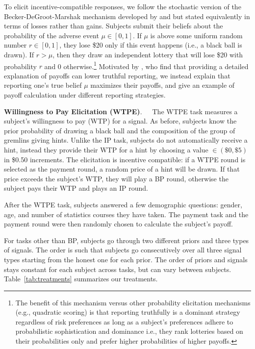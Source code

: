 \documentclass[12pt,a4paper]{article}
\begin{document}
To elicit incentive-compatible responses, we follow the stochastic version of the Becker-DeGroot-Marshak mechanism developed by \citet{grether_testing_1992} and \citet{holt_update_2009} but stated equivalently in terms of losses rather than gains.  Subjects submit their beliefs about the probability of the adverse event $\mu \in [0,1]$. If $\mu$ is above some uniform random number $r\in[0,1]$, they lose \$20 only if this event happens (i.e., a black ball is drawn). If $r > \mu$, then they draw an independent lottery that will lose \$20 with probability $r$ and 0 otherwise.\footnote{The benefit of this mechanism versus other probability elicitation mechanisms (e.g., quadratic scoring) is that reporting truthfully is a dominant strategy regardless of risk preferences \citep{karni_mechanism_2009-1} as long as a subject's preferences adhere to probabilistic sophistication and dominance i.e., they rank lotteries based on their probabilities only and prefer higher probabilities of higher payoffs.} Motivated by \citet{danz_belief_2020}, who find that providing a detailed explanation of payoffs can lower truthful reporting, we instead explain that reporting one's true belief $\mu$ maximizes their payoffs, and give an example of payoff calculation under different reporting strategies.

\bigskip
\noindent\textbf{Willingness to Pay Elicitation (WTPE)}.\ \ \ The WTPE task measures a subject's willingness to pay (WTP) for a signal. As before, subjects know the prior probability of drawing a black ball and the composition of the group of gremlins giving hints.  Unlike the IP task, subjects do not automatically receive a hint, instead they provide their WTP for a hint by choosing a value $\in (\$0,\$5)$ in \$0.50 increments. The elicitation is incentive compatible: if a WTPE round is selected as the payment round, a random price of a hint will be drawn. If that price exceeds the subject's WTP, they will play a BP round, otherwise the subject pays their WTP and plays an IP round.  


After the WTPE task, subjects answered a few demographic questions: gender, age, and number of statistics courses they have taken. The payment task and the payment round were then randomly chosen to calculate the subject's payoff. 

For tasks other than BP, subjects go through two different priors and three types of signals. The order is such that subjects go consecutively over all three signal types starting from the honest one for each prior. The order of priors and signals stays constant for each subject across tasks, but can vary between subjects. Table~\ref{tab:treatments} summarizes our treatments.
\end{document}
